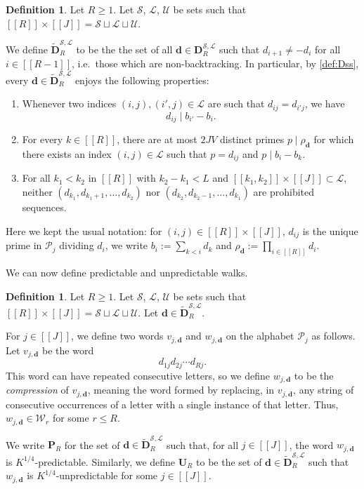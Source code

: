 \documentclass[11pt]{amsart}
\theoremstyle{definition}
\newtheorem{definition}[theorem]{Definition}
\renewcommand{\leq}{\leqslant}
\renewcommand{\geq}{\geqslant}
\newcommand{\interval}[2]{[\![#1,#2]\!] }
\newcommand{\sinterval}[1]{[\![#1]\!] }
\newcommand{\primes}{\mathcal{P}}
\renewcommand{\d}{\boldsymbol{d}}
\newcommand{\pcomp}[2]{d_{#1#2}}
\newcommand{\curlyL}{V}
\newcommand{\sommespart}{b}
\newcommand{\pred}{\mathbf{P}_{\!\tupsize}}
\newcommand{\unpred}{\mathbf{U}_{\!\tupsize}}
\newcommand{\fprod}[1]{\rho_{#1}}
\newcommand{\pall}{\fprod{\d}}
\newcommand{\word}{\mathcal{W}}
\newcommand{\lit}{\mathcal{L}}
\newcommand{\unlit}{\mathcal{U}}
\newcommand{\s}{\mathcal{S}}
\newcommand{\fancyD}{\mathbf{D}}
\newcommand{\DssR}{\fancyD^{\s,\lit}_{\!\tupsize}}
\newcommand{\Dnb}{\widetilde{\fancyD}^{\s,\lit}_{\!\tupsize}}
\newcommand{\elln}{L}
\newcommand{\repR}{J}
\newcommand{\repK}{K}
\newcommand{\newR}{\sinterval{J}}
\newcommand{\tupsize}{R}
\begin{document}
\begin{definition}
\label{def:dnb}
Let $\tupsize\geq 1$. Let $\s$, $\lit$, $\unlit$ be sets such that $\sinterval{\tupsize}\times \newR = \s\sqcup\lit\sqcup\unlit$. 

We define $\Dnb$ to be the the set of all $\d\in \DssR$ such that $d_{i+1}\neq -d_i$ for all $i\in \sinterval{\tupsize-1}$, i.e.~those which are non-backtracking. In particular, by \cref{def:Dss}, every $\d\in \Dnb$ enjoys the following properties:
\begin{enumerate}
	\item \label{item:litcond1x} Whenever two indices $(i,j), (i',j)\in \lit$ are such that $\pcomp{i}{j} = \pcomp{i'}{j}$, we have
	\begin{equation*}
		\pcomp{i}{j} \mid \sommespart_{i'} - \sommespart_{i}.
	\end{equation*}
	\item \label{item:litcond2x} For every $k\in \sinterval{\tupsize}$, there are at most $2\repR\curlyL$ distinct primes $p\mid \pall$ for which there exists an index $(i,j)\in \lit$ such that $p = \pcomp{i}{j}$ and $p\mid \sommespart_{i} - \sommespart_{k}$.
	\item \label{item:litcond3x} 
	For all $k_1 < k_2$ in $\sinterval{\tupsize}$ with $k_2-k_1 < \elln$ and $\interval{k_1}{k_2} \times \newR \subset \lit$, neither $(d_{k_1}, d_{k_1+1}, \ldots, d_{k_2})$ nor $(d_{k_2}, d_{k_2-1}, \ldots, d_{k_1})$ are prohibited sequences.
\end{enumerate}
Here we kept the usual notation: for ${(i,j)\in \sinterval{\tupsize}\times \newR}$, $\pcomp{i}{j}$ is the unique prime in $\primes_j$ dividing $d_i$, we write ${\sommespart_i := \sum_{k<i}d_{k}}$ and $\pall := \prod_{i\in \sinterval{\tupsize}} d_{i}$.
\end{definition}

We can now define predictable and unpredictable walks.

\begin{definition}
\label{def:predunpred}
Let $\tupsize\geq 1$. Let $\s$, $\lit$, $\unlit$ be sets such that $\sinterval{\tupsize}\times \newR = \s\sqcup\lit\sqcup\unlit$. Let $\d\in \Dnb$. 

For $j\in \newR$, we define two words $v_{j,\d}$ and $w_{j,\d}$ on the alphabet $\primes_j$ as follows. Let $v_{j,\d}$ be the word
\begin{equation}
\label{eq:notcompressed}
	\pcomp{1}{j}\pcomp{2}{j}\cdots \pcomp{\tupsize}{j}.
\end{equation}
This word can have repeated consecutive letters, so we define $w_{j,\d}$ to be the \emph{compression} of $v_{j,\d}$, meaning the word formed by replacing, in $v_{j,\d}$, any string of consecutive occurrences of a letter with a single instance of that letter. Thus, $w_{j,\d} \in \word_{r}$ for some $r \leq \tupsize$.

We write $\pred$ for the set of $\d\in \Dnb$ such that, for all $j\in \newR$, the word $w_{j,\d}$ is {$\repK^{1/4}$-predictable}. Similarly, we define $\unpred$ to be the set of $\d\in \Dnb$ such that $w_{j,\d}$ is $\repK^{1/4}$-unpredictable for some $j\in \newR$.
\end{definition}
\end{document}
